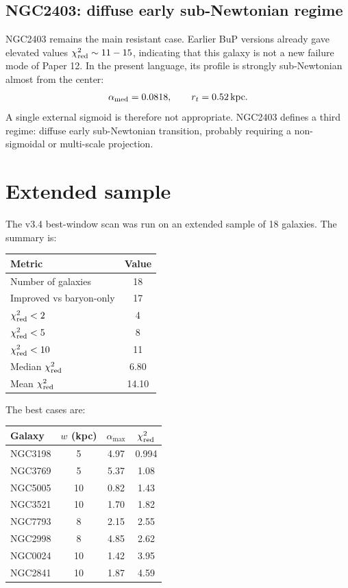 \documentclass[11pt,a4paper]{article}
\begin{document}
\subsection{NGC2403: diffuse early sub-Newtonian regime}

NGC2403 remains the main resistant case. Earlier BuP versions already gave
elevated values \(\chi^2_{\rm red}\sim 11-15\), indicating that this galaxy is
not a new failure mode of Paper 12. In the present language, its profile is
strongly sub-Newtonian almost from the center:
\[
\alpha_{\rm med}=0.0818,
\qquad
r_t=0.52\,{\rm kpc}.
\]
A single external sigmoid is therefore not appropriate. NGC2403 defines a
third regime: diffuse early sub-Newtonian transition, probably requiring a
non-sigmoidal or multi-scale projection.

\section{Extended sample}

The v3.4 best-window scan was run on an extended sample of 18 galaxies. The
summary is:

\begin{table}[h]
\centering
\begin{tabular}{lc}
\toprule
Metric & Value \\
\midrule
Number of galaxies & 18 \\
Improved vs baryon-only & 17 \\
\(\chi^2_{\rm red}<2\) & 4 \\
\(\chi^2_{\rm red}<5\) & 8 \\
\(\chi^2_{\rm red}<10\) & 11 \\
Median \(\chi^2_{\rm red}\) & 6.80 \\
Mean \(\chi^2_{\rm red}\) & 14.10 \\
\bottomrule
\end{tabular}
\end{table}

The best cases are:

\begin{table}[h]
\centering
\begin{tabular}{lccc}
\toprule
Galaxy & \(w\) (kpc) & \(\alpha_{\max}\) & \(\chi^2_{\rm red}\) \\
\midrule
NGC3198 & 5 & 4.97 & 0.994 \\
NGC3769 & 5 & 5.37 & 1.08 \\
NGC5005 & 10 & 0.82 & 1.43 \\
NGC3521 & 10 & 1.70 & 1.82 \\
NGC7793 & 8 & 2.15 & 2.55 \\
NGC2998 & 8 & 4.85 & 2.62 \\
NGC0024 & 10 & 1.42 & 3.95 \\
NGC2841 & 10 & 1.87 & 4.59 \\
\bottomrule
\end{tabular}
\end{table}
\end{document}
